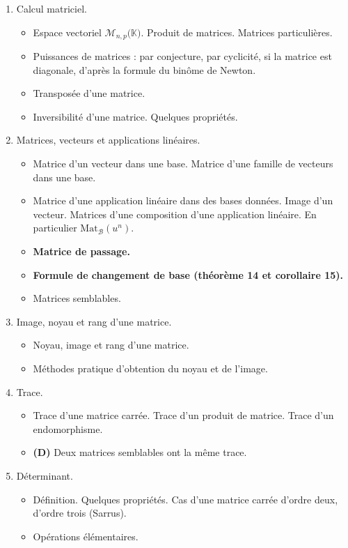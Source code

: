 \documentclass[twoside,a4paper,french,10pt]{VcCours}
\begin{document}
\begin{enumerate}
\item Calcul matriciel.
\begin{itemize}
\item Espace vectoriel $\mathcal{M}_{n,p}(\mathbb{K)}$. Produit de matrices. Matrices particulières. 
\item Puissances de matrices : par conjecture, par cyclicité, si la matrice est diagonale, d'après la formule du binôme de Newton.
\item Transposée d'une matrice.
\item Inversibilité d'une matrice. Quelques propriétés. 
\end{itemize}
\item Matrices, vecteurs et applications linéaires.
\begin{itemize}
\item Matrice d'un vecteur dans une base. Matrice d'une famille de vecteurs dans une base.
\item Matrice d'une application linéaire dans des bases données. Image d'un vecteur. Matrices d'une composition d'une application linéaire. En particulier $\textrm{Mat}_{\mathcal{B}}(u^n)$. 
\item \textbf{Matrice de passage.}
\item \textbf{Formule de changement de base (théorème 14 et corollaire 15).}
\item Matrices semblables.
\end{itemize}
\item Image, noyau et rang d'une matrice.
\begin{itemize}
\item Noyau, image et rang d'une matrice.
\item Méthodes pratique d'obtention du noyau et de l'image. 
\end{itemize}
\item Trace.
\begin{itemize}
\item Trace d'une matrice carrée. Trace d'un produit de matrice. Trace d'un endomorphisme. 
\item \textbf{(D)} Deux matrices semblables ont la même trace.
\end{itemize}
\item Déterminant.
\begin{itemize}
\item Définition. Quelques propriétés. Cas d'une matrice carrée d'ordre deux, d'ordre trois (Sarrus). 
\item Opérations élémentaires.

\end{itemize}
\end{enumerate}
\end{document}
